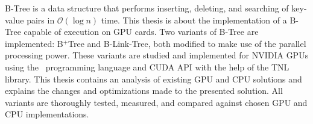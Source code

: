 B-Tree is a data structure that performs inserting, deleting, and searching of key-value pairs in $\mathcal{O}(\log{n})$ time. This thesis is about the implementation of a B-Tree capable of execution on GPU cards. Two variants of B-Tree are implemented: B$^+$Tree and B-Link-Tree, both modified to make use of the parallel processing power. These variants are studied and implemented for NVIDIA GPUs using the \CC\ programming language and CUDA API with the help of the TNL library. This thesis contains an analysis of existing GPU and CPU solutions and explains the changes and optimizations made to the presented solution. All variants are thoroughly tested, measured, and compared against chosen GPU and CPU implementations.